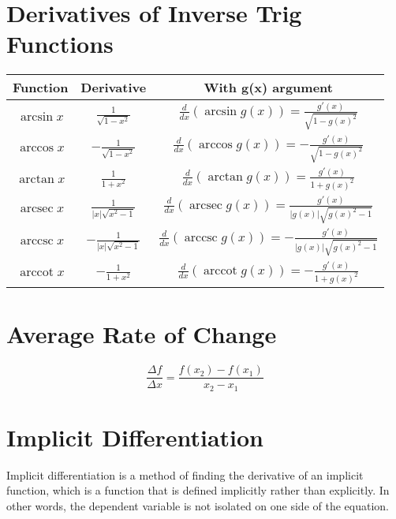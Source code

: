 \section{Derivatives of Inverse Trig Functions}
\begin{center}
  \begin{tabular}{|c|c|c|}
    \hline
    \textbf{Function} & \textbf{Derivative} & \textbf{With g(x) argument} \\
    \hline
    $\arcsin{x}$ & $\frac{1}{\sqrt{1-x^2}}$ & $\frac{d}{dx}(\arcsin{g(x)}) = \frac{g'(x)}{\sqrt{1-g(x)^2}}$ \\
    \hline
    $\arccos{x}$ & $-\frac{1}{\sqrt{1-x^2}}$ & $\frac{d}{dx}(\arccos{g(x)}) = -\frac{g'(x)}{\sqrt{1-g(x)^2}}$ \\
    \hline
    $\arctan{x}$ & $\frac{1}{1+x^2}$ & $\frac{d}{dx}(\arctan{g(x)}) = \frac{g'(x)}{1+g(x)^2}$ \\
    \hline
    $\operatorname{arcsec}{x}$ & $\frac{1}{|x|\sqrt{x^2-1}}$ & $\frac{d}{dx}(\operatorname{arcsec}{g(x)}) = \frac{g'(x)}{|g(x)|\sqrt{g(x)^2-1}}$ \\
    \hline
    $\operatorname{arccsc}{x}$ & $-\frac{1}{|x|\sqrt{x^2-1}}$ & $\frac{d}{dx}(\operatorname{arccsc}{g(x)}) = -\frac{g'(x)}{|g(x)|\sqrt{g(x)^2-1}}$ \\
    \hline
    $\operatorname{arccot}{x}$ & $-\frac{1}{1+x^2}$ & $\frac{d}{dx}(\operatorname{arccot}{g(x)}) = -\frac{g'(x)}{1+g(x)^2}$ \\
    \hline
    \end{tabular}
\end{center}


\section{Average Rate of Change}
\begin{equation*}
  \frac{\Delta f}{\Delta x} = \frac{f(x_2)-f(x_1)}{x_2-x_1}
\end{equation*}


\section{Implicit Differentiation}

Implicit differentiation is a method of finding the derivative of an implicit function, which is a function that is defined implicitly rather than explicitly. In other words, the dependent variable is not isolated on one side of the equation. 

